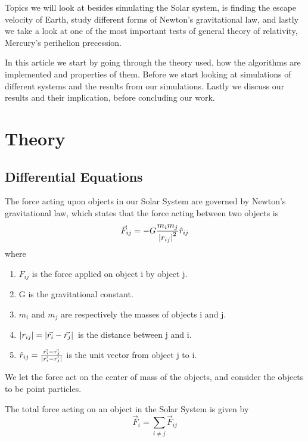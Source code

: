 \documentclass[%
reprint,
nofootinbib,
amsmath,amssymb,
aps,
]{revtex4-1}
\begin{document}
Topics we will look at besides simulating the Solar system, is finding the escape velocity of Earth, study different forms of Newton's gravitational law, and lastly we take a look at one of the most important tests of general theory of relativity, Mercury's perihelion precession. 

In this article we start by going through the theory used, how the algorithms are implemented and properties of them. Before we start looking at simulations of different systems and the results from our simulations. Lastly we discuss our results and their implication, before concluding our work. 
\section{Theory} %
\subsection{Differential Equations}%
The force acting upon objects in our Solar System are governed by Newton's gravitational law, which states that the force acting between two objects is 
\begin{equation}
	\vec{F}_{ij} =  -G \frac{m_im_j}{\abs{r_{ij}}^2}\hat{r}_{ij}
\end{equation}
where 
\begin{enumerate}
	\item	$F_{ij}$ is the force applied on object i by object j.
	\item G is the gravitational constant.
	\item	$m_i$ and $m_j$ are respectively the masses of objects i and j. 
	\item $\abs{r_{ij}} = \abs{\vec{r_i} - \vec{r_j}}$ is the distance between j and i.
	\item	$\hat{r}_{ij} = \frac{\vec{r_i}-\vec{r_j}}{\abs{\vec{r_i} - \vec{r_j}}}$ is the unit vector from object j to i.
\end{enumerate}
We let the force act on the center of mass of the objects, and consider the objects to be point particles. 

The total force acting on an object in the Solar System is given by 
\begin{equation}
	\vec{F}_i = \sum_{i\neq j} \vec{F}_{ij}
\end{equation}
\end{document}
